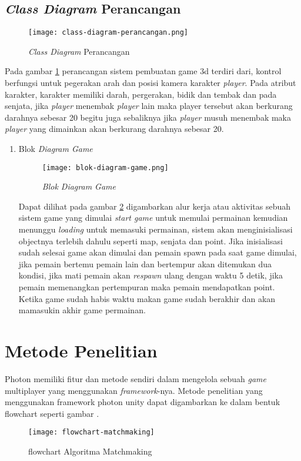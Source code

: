 \subsection{\textit{Class Diagram} Perancangan}
\begin{figure}[h]
   \centering
   \texttt{[image: class-diagram-perancangan.png]}
    \caption{\textit{Class Diagram} Perancangan}
    \label{fig:class-diagram-game}
\end{figure}

Pada gambar \ref{fig:class-diagram-game} perancangan sistem pembuatan game 3d terdiri dari, kontrol berfungsi untuk pegerakan arah dan posisi kamera karakter \textit{player}. Pada atribut karakter, karakter memiliki darah, pergerakan, bidik dan tembak  dan pada senjata, jika \textit{player} menembak \textit{player} lain maka player tersebut akan berkurang darahnya sebesar 20 begitu juga sebaliknya jika \textit{player} musuh menembak maka \textit{player} yang dimainkan akan berkurang darahnya sebesar 20.
\begin{enumerate}
    \item Blok \textit{Diagram Game}
    \begin{figure}[h]
        \centering
        \texttt{[image: blok-diagram-game.png]}
        \caption{\textit{Blok Diagram Game}}
        \label{fig:aclass-diagram-game}
    \end{figure}

    Dapat dilihat pada gambar \ref{fig:aclass-diagram-game} digambarkan alur kerja atau aktivitas sebuah sistem game yang dimulai \textit{start game} untuk memulai permainan kemudian menunggu \textit{loading} untuk memasuki permainan, sistem akan menginisialisasi objectnya terlebih dahulu seperti map, senjata dan point.
    Jika inisialisasi sudah selesai game akan dimulai dan pemain spawn pada saat game dimulai, jika pemain bertemu pemain lain dan bertempur akan ditemukan dua kondisi, jika mati pemain akan \textit{respawn} ulang dengan waktu 5 detik, jika pemain memenangkan pertempuran maka pemain mendapatkan point.
    Ketika game sudah habis waktu makan game sudah berakhir dan akan mamasukin akhir game permainan.
\end{enumerate}
\newpage

\section{Metode Penelitian}
\noindent

Photon memiliki fitur dan metode sendiri dalam mengelola sebuah \textit{game} multiplayer yang menggunakan \textit{framework}-nya. Metode penelitian yang menggunakan framework photon unity dapat digambarkan ke dalam bentuk flowchart seperti gambar .
        \begin{figure}[h]
         \centering
         \caption{flowchart Algoritma Matchmaking}
         \texttt{[image: flowchart-matchmaking]}
         \label{fig:algoritmamatmaching}
         \end{figure}

